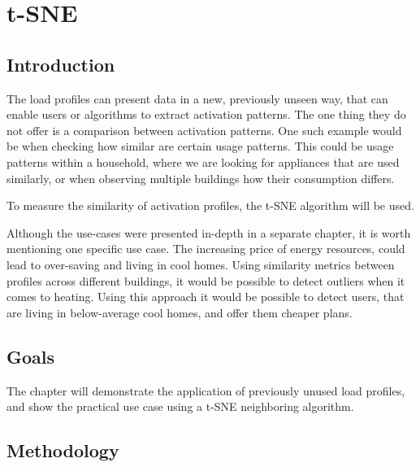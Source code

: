 
\chapter{t-SNE} %

\label{Chapter8} %


\section{Introduction}

The load profiles can present data in a new, previously unseen way, that can enable users or algorithms to extract activation patterns.
The one thing they do not offer is a comparison between activation patterns.
One such example would be when checking how similar are certain usage patterns.
This could be usage patterns within a household, where we are looking for appliances that are used similarly,
or when observing multiple buildings how their consumption differs. 

To measure the similarity of activation profiles, the t-SNE algorithm will be used.

Although the use-cases were presented in-depth in a separate chapter, it is worth mentioning one specific use case.
The increasing price of energy resources, could lead to over-saving and living in cool homes.
Using similarity metrics between profiles across different buildings, it would be possible to detect outliers when it comes to heating. 
Using this approach it would be possible to detect users, that are living in below-average cool homes, and offer them cheaper plans. 

\section{Goals}

The chapter will demonstrate the application of previously unused load profiles,
and show the practical use case using a t-SNE neighboring algorithm.

\section{Methodology}

